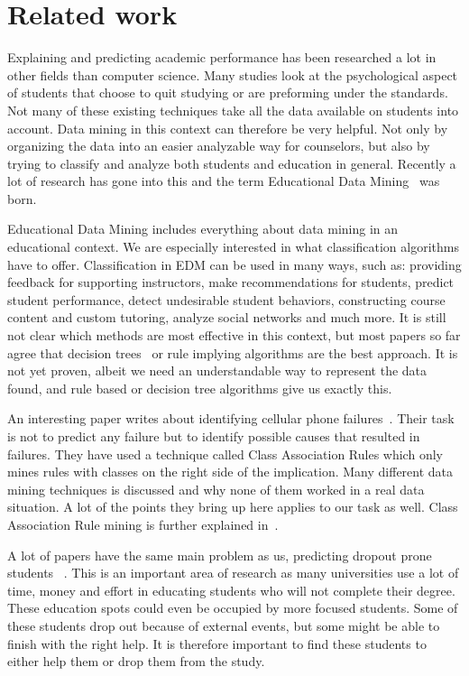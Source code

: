 \chapter{Related work}\label{ch:related}
Explaining and predicting academic performance has been researched a lot in other fields than computer science. Many studies look at the psychological aspect of students that choose to quit studying or are preforming under the standards. Not many of these existing techniques take all the data available on students into account. Data mining in this context can therefore be very helpful. Not only by organizing the data into an easier analyzable way for counselors, but also by trying to classify and analyze both students and education in general. Recently a lot of research has gone into this and the term Educational Data Mining~\cite{1} was born.

\bigskip\noindent
Educational Data Mining includes everything about data mining in an educational context.
We are especially interested in what classification algorithms have to offer. 
Classification in EDM can be used in many ways, such as:
providing feedback for supporting instructors,
make recommendations for students,
predict student performance,
detect undesirable student behaviors,
constructing course content and custom tutoring,
analyze social networks and much more.
It is still not clear which methods are most effective in this context, but most papers so far agree that decision trees~\cite{2,12} or rule implying algorithms are the best approach.
It is not yet proven, albeit we need an understandable way to represent the data found, and rule based or decision tree algorithms give us exactly this. 

\bigskip\noindent
An interesting paper writes about identifying cellular phone failures~\cite{3}.
Their task is not to predict any failure but to identify possible causes that resulted in failures.  
They have used a technique called Class Association Rules which only mines rules with classes on the right side of the implication. 
Many different data mining techniques is discussed and why none of them worked in a real data situation. 
A lot of the points they bring up here applies to our task as well.
Class Association Rule mining is further explained in~\cite{4}.

\bigskip\noindent
A lot of papers have the same main problem as us, predicting dropout prone students~\cite{5,7,8,9,11} .
This is an important area of research as many universities use a lot of time, 
money and effort in educating students who will not complete their degree. 
These education spots could even be occupied by more focused students. 
Some of these students drop out because of external events, but some might be able to finish with the right help. 
It is therefore important to find these students to either help them or drop them from the study. 

